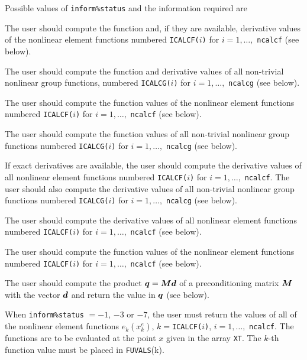 \documentclass{galahad}
\begin{document}
Possible values of {\tt inform\%status} and the information required are
\begin{description}
 The user should compute the function
     and, if they are available,
     derivative values of the nonlinear element functions
     numbered {\tt ICALCF($i$)} for $i=1, \ldots,$ {\tt ncalcf}
     (see below).

 The user should compute the function
     and derivative values of all non-trivial nonlinear group functions,
     numbered {\tt ICALCG($i$)} for $i=1, \ldots,$ {\tt ncalcg}
     (see below).

 The user should compute the
     function values
     of the nonlinear element functions
     numbered {\tt ICALCF($i$)} for $i=1, \ldots,$ {\tt ncalcf}
     (see below).

 The user should compute the function
     values of all non-trivial nonlinear group  functions
     numbered {\tt ICALCG($i$)} for $i=1, \ldots,$ {\tt ncalcg}
     (see below).

 If exact derivatives are available,
     the user should compute the
     derivative values of all nonlinear element functions
     numbered {\tt ICALCF($i$)} for $i=1, \ldots,$ {\tt ncalcf}.
     The user should also compute the derivative
     values of all non-trivial nonlinear group  functions
     numbered {\tt ICALCG($i$)} for $i=1, \ldots,$ {\tt ncalcg}
     (see below).

 The user should compute the
     derivative values of all nonlinear element functions
     numbered {\tt ICALCF($i$)} for $i=1, \ldots,$ {\tt ncalcf}
     (see below).

 The user should compute the
     function values
     of the nonlinear element functions
     numbered {\tt ICALCF($i$)} for $i=1, \ldots,$ {\tt ncalcf}
     (see below).

 The user should compute the
     product ${\bm{q}} = {\bm{M}}{\bm{d}}$ of a preconditioning matrix ${\bm{M}}$
     with the vector ${\bm{d}}$ and return the value in ${\bm{q}}$
     (see below).
\end{description}

When {\tt inform\%status} $= -1$, $-3$ or $-7$, the user must return the
values of all
of the nonlinear element functions
$e_k(x^e_k)$,
$k = ${\tt ICALCF($i$)}, $i= 1, \ldots,$ {\tt ncalcf}.
The functions are to be evaluated at the point $x$ given
in the array {\tt XT}.
The $k$-th function value must be placed in {\tt FUVALS}(k).
\end{document}
